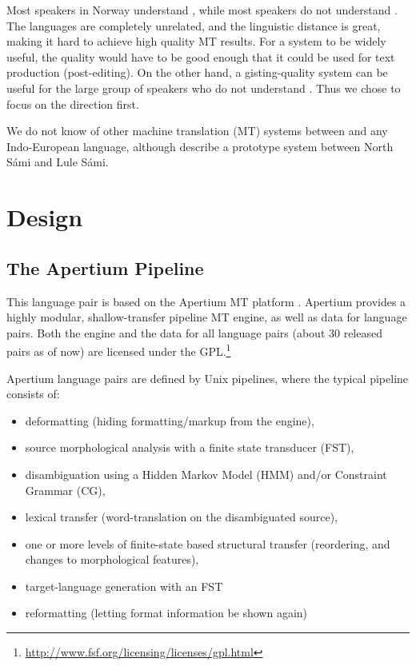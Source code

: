 Most \sme{} speakers in Norway understand \nob{}, while most \nob{}
speakers do not understand \sme{}. The languages are completely
unrelated, and the linguistic distance is great, making it hard to
achieve high quality MT results. For a \nobsme{} system to be widely
useful, the quality would have to be good enough that it could be used
for text production (post-editing). On the other hand, a \smenob{}
gisting-quality system can be useful for the large group of \nob{}
speakers who do not understand \sme{}. Thus we chose to focus on the
\smenob{} direction first.

We do not know of other machine translation (MT) systems between \sme{}
and any Indo-European language, although \citet{tyers2009dpm} describe %
a prototype system between North S\'{a}mi and Lule S\'{a}mi.



\section{Design}
 \label{sec:design}

\subsection{The Apertium Pipeline}
This language pair is based on the Apertium MT
platform \citep{forcada2011afp,zubizarreta2009amt}. Apertium provides a
highly modular, shallow-transfer pipeline MT engine, as well as data
for language pairs. Both the engine and the data for all language
pairs (about 30 released pairs as of now) are licensed under the
GPL.\footnote{\href{http://www.fsf.org/licensing/licenses/gpl.html}{http://www.fsf.org/licensing/licenses/gpl.html}}

Apertium language pairs are defined by Unix pipelines, where the
typical pipeline consists of:

\begin{itemize}
\item deformatting (hiding formatting/markup from the engine),
\item source morphological analysis with a finite state transducer
  (FST),
\item disambiguation using a Hidden Markov Model (HMM) and/or
  Constraint Grammar (CG), 
\item lexical transfer (word-translation on the disambiguated source),
\item one or more levels of finite-state based structural transfer
  (reordering, and changes to morphological features),
\item target-language generation with an FST
\item reformatting (letting format information be shown again)
\end{itemize}

